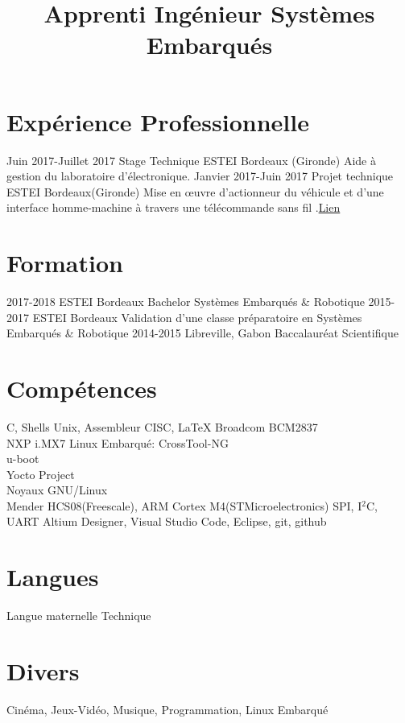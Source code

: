 \documentclass[10pts,a4paper,sans]{moderncv}
\title{Apprenti Ingénieur Systèmes Embarqués }
\begin{document}
\maketitle

\section{Expérience Professionnelle}
\cventry{} {Juin 2017-Juillet 2017} {Stage Technique} {ESTEI} {Bordeaux (Gironde)} {Aide à gestion du laboratoire d’électronique.} {}
\cventry{} {Janvier 2017-Juin 2017} {Projet technique} {ESTEI} {Bordeaux(Gironde)} {Mise en œuvre d'actionneur du véhicule et d'une interface homme-machine à travers une télécommande sans fil .\href{https://github.com/jorisoffouga/projet_vehicule_interactif_B2}{Lien}}
{} {}

\section{Formation}
\cventry{} {2017-2018} {ESTEI} {Bordeaux} {Bachelor Systèmes Embarqués \& Robotique} {}
\cventry{} {2015-2017} {ESTEI} {Bordeaux} {Validation d'une classe préparatoire en Systèmes Embarqués \& Robotique} {}
\cventry{} {2014-2015} {Libreville, Gabon} {Baccalauréat Scientifique} {} {}

\section{Compétences}
 {C, Shells Unix, Assembleur CISC, \LaTeX} 
 {Broadcom BCM2837 \\ NXP i.MX7} {Linux Embarqué:}{ 
	CrossTool-NG
	\\ u-boot
	\\ Yocto Project 
	\\ Noyaux GNU/Linux
	\\ Mender
}
 {HCS08(Freescale), ARM Cortex M4(STMicroelectronics)}
 {SPI, I$^{2}$C, UART} 
 {Altium Designer, Visual Studio Code, Eclipse, git, github }
\section{Langues}
 {Langue maternelle}
 {Technique}
 
\section{Divers}
 {Cinéma, Jeux-Vidéo, Musique, Programmation, Linux Embarqué}
\end{document}
